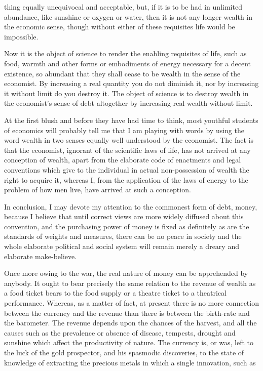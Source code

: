 \documentclass[10.5pt,twoside]{book}
\newcommand{\origpage}[1]{\clearpage\setcounter{page}{#1}}
\begin{document}
\origpage{16}

\noindent thing equally unequivocal and acceptable, but, if it is to be had in
unlimited abundance, like sunshine or oxygen or water, then it is not any
longer wealth in the economic sense, though without either of these requisites
life would be impossible.

Now it is the object of science to render the enabling requisites of life,
such as food, warmth and other forms or embodiments of energy necessary for a
decent existence, so abundant that they shall cease to be wealth in the sense
of the economist. By increasing a real quantity you do not diminish it, nor by
increasing it without limit do you destroy it. The object of science is to
destroy wealth in the economist's sense of debt altogether by increasing real
wealth without limit.

At the first blush and before they have had time to think, most youthful
students of economics will probably tell me that I am playing with words by
using the word wealth in two senses equally well understood by the economist.
The fact is that the economist, ignorant of the scientific laws of life, has
not arrived at any conception of wealth, apart from the elaborate code of
enactments and legal conventions which give to the individual in actual
non-possession of wealth the right to acquire it, whereas I, from the
application of the laws of energy to the problem of how men live, have arrived
at such a conception.

In conclusion, I may devote my attention to the commonest form of debt, money,
because I believe that until correct views are more widely diffused about this
convention, and the purchasing power of money is fixed as definitely as are
the standards of weights and measures, there can be no peace in society and
the whole elaborate political and social system will remain merely a dreary
and elaborate make-believe.

Once more owing to the war, the real nature of money can be apprehended by
anybody. It ought to bear precisely the same relation to the revenue of wealth
as a food ticket bears to the food supply or a theatre ticket to a theatrical
performance. Whereas, as a matter of fact, at present there is no more
connection between the currency and the revenue than there is between the
birth-rate and the barometer. The revenue depends upon the chances of the
harvest, and all the causes such as the prevalence or absence of disease,
tempests, drought and sunshine which affect the productivity of nature. The
currency is, or was, left to the luck of the gold prospector, and his
spasmodic discoveries, to the state of knowledge of extracting the precious
metals in which a single innovation, such as
\end{document}
